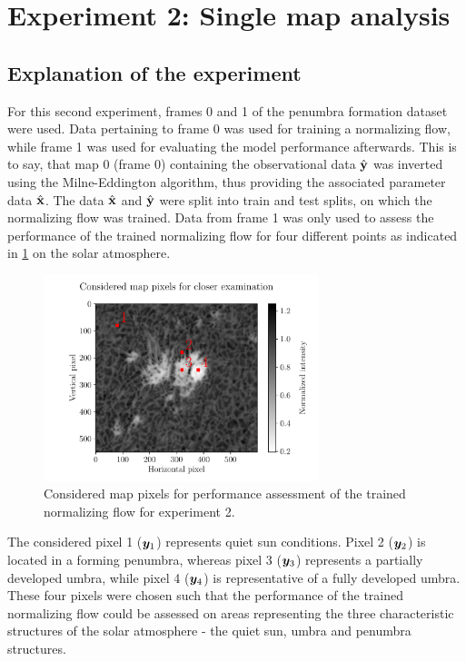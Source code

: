 \documentclass[a4paper,12pt]{report}
\begin{document}
\section{Experiment 2: Single map analysis}
\subsection{Explanation of the experiment}
For this second experiment, frames 0 and 1 of the penumbra formation dataset were used. Data pertaining to frame 0 was used for training a normalizing flow, while frame 1 was used for evaluating the model performance afterwards. This is to say, that map 0 (frame 0) containing the observational data $\hat{\boldsymbol{\mathbf{y}}}$ was inverted using the Milne-Eddington algorithm, thus providing the associated parameter data $\hat{\boldsymbol{\mathbf{x}}}$. The data $\hat{\boldsymbol{\mathbf{x}}}$ and $\hat{\boldsymbol{\mathbf{y}}}$ were split into train and test splits, on which the normalizing flow was trained. Data from frame 1 was only used to assess the performance of the trained normalizing flow for four different points as indicated in \cref{fig:nf-milne-eddington-example-6-considered-map-pixels-nflows-piecewisequadratic} on the solar atmosphere.
\begin{figure}[h]
\centering
\includegraphics[width=8cm]{figures/nf-milne-eddington-example-6-considered-map-pixels-nflows-piecewisequadratic.pdf}
\caption{Considered map pixels for performance assessment of the trained normalizing flow for experiment 2.}
\label{fig:nf-milne-eddington-example-6-considered-map-pixels-nflows-piecewisequadratic}
\end{figure}
The considered pixel 1 ($\bm{y}_1$) represents quiet sun conditions. Pixel 2 ($\bm{y}_2$) is located in a forming penumbra, whereas pixel 3 ($\bm{y}_3$) represents a partially developed umbra, while pixel 4 ($\bm{y}_4$) is representative of a fully developed umbra. These four pixels were chosen such that the performance of the trained normalizing flow could be assessed on areas representing the three characteristic structures of the solar atmosphere - the quiet sun, umbra and penumbra structures.
\end{document}
